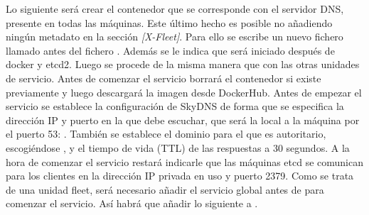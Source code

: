 Lo siguiente será crear el contenedor que se corresponde con el servidor DNS, presente en todas las máquinas. Este último hecho es posible no añadiendo ningún metadato en la sección \textit{[X-Fleet]}. Para ello se escribe un nuevo fichero llamado  antes del fichero . Además se le indica que será iniciado después de docker y etcd2. Luego se procede de la misma manera que con las otras unidades de servicio. Antes de comenzar el servicio borrará el contenedor si existe previamente y luego descargará la imagen desde DockerHub. Antes de empezar el servicio se establece la configuración de SkyDNS de forma que se especifica la dirección IP y puerto en la que debe escuchar, que será la local a la máquina por el puerto 53: . También se establece el dominio para el que es autoritario, escogiéndose , y el tiempo de vida (TTL) de las respuestas a 30 segundos. A la hora de comenzar el servicio restará indicarle que las máquinas etcd se comunican para los clientes en la dirección IP privada en uso y puerto 2379. Como se trata de una unidad fleet, será necesario añadir el servicio global  antes de  para comenzar el servicio. Así habrá que añadir lo siguiente a .

\begin{codelisting}
\label{code:user-data-skydns}
\end{codelisting}

